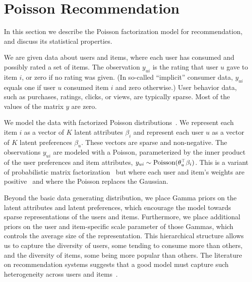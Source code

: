 \section{Poisson Recommendation}
\label{sec:model}


In this section we describe the Poisson factorization model for
recommendation, and discuss its statistical properties.

We are given data about users and items, where each user has consumed
and possibly rated a set of items.  The observation $y_{ui}$ is the
rating that user $u$ gave to item $i$, or zero if no rating was given.
(In so-called ``implicit'' consumer data, $y_{ui}$ equals one if user
$u$ consumed item $i$ and zero otherwise.)  User behavior data, such
as purchases, ratings, clicks, or views, are typically sparse.  Most
of the values of the matrix $y$ are zero.

We model the data with factorized Poisson
distributions~\cite{Canny:2004}.  We represent each item $i$ as a
vector of $K$ latent attributes $\beta_i$ and represent each user $u$
as a vector of $K$ latent preferences $\beta_u$.  These vectors are
sparse and non-negative.  The observations $y_{ui}$ are modeled with a
Poisson, parameterized by the inner product of the user preferences
and item attributes, $y_{ui} \sim \textrm{Poisson}(\theta_u^\top \beta_i)$.
This is a variant of probabilistic matrix
factorization~\cite{Salakhutdinov:2008a} but where each user and
item's weights are positive~\cite{Lee:1999} and where the Poisson
replaces the Gaussian.

Beyond the basic data generating distribution, we place Gamma priors
on the latent attributes and latent preferences, which encourage the
model towards sparse representations of the users and items.
Furthermore, we place additional priors on the user and item-specific
scale parameter of those Gammas, which controls the average size of
the representation.  This hierarchical structure allows us to capture
the diversity of users, some tending to consume more than others, and
the diversity of items, some being more popular than others.  The
literature on recommendation systems suggests that a good model must
capture such heterogeneity across users and items~\cite{Koren:2009}.

